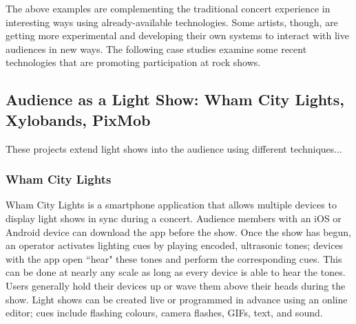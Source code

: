 
The above examples are complementing the traditional concert experience in interesting ways using already-available technologies. Some artists, though, are getting more experimental and developing their own systems to interact with live audiences in new ways. The following case studies examine some recent technologies that are promoting participation at rock shows.

\subsection{Audience as a Light Show: Wham City Lights, Xylobands, PixMob}

These projects extend light shows into the audience using different techniques...

\subsubsection{Wham City Lights}

Wham City Lights is a smartphone application that allows multiple devices to display light shows in sync during a concert. Audience members with an iOS or Android device can download the app before the show. Once the show has begun, an operator activates lighting cues by playing encoded, ultrasonic tones; devices with the app open ``hear" these tones and perform the corresponding cues. This can be done at nearly any scale as long as every device is able to hear the tones. Users generally hold their devices up or wave them above their heads during the show. Light shows can be created live or programmed in advance using an online editor; cues include flashing colours, camera flashes, GIFs, text, and sound.

